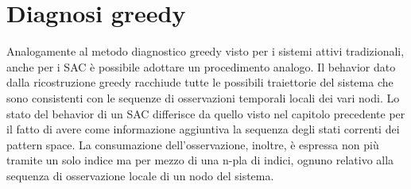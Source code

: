 \newpage
\section{Diagnosi greedy} \label{section_greedy}
Analogamente al metodo diagnostico greedy visto per i sistemi attivi tradizionali, anche per i SAC è possibile adottare un procedimento analogo. Il behavior dato dalla ricostruzione greedy racchiude tutte le possibili traiettorie del sistema che sono consistenti con le sequenze di osservazioni temporali locali dei vari nodi.
Lo stato del behavior di un SAC differisce da quello visto nel capitolo precedente per il fatto di avere come informazione aggiuntiva la sequenza degli stati correnti dei pattern space. La consumazione dell'osservazione, inoltre, è espressa non più tramite un solo indice ma per mezzo di una n-pla di indici, ognuno relativo alla sequenza di osservazione locale di un nodo del sistema.

